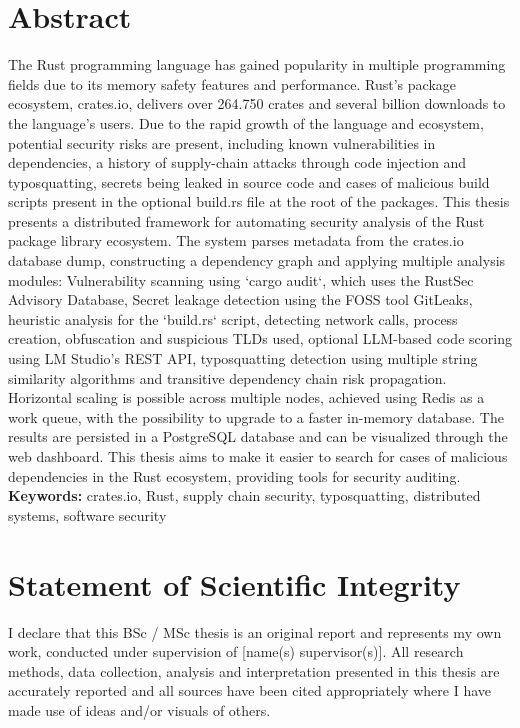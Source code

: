 \documentclass[12pt,a4paper]{book}
\theoremstyle{definition}
\theoremstyle{remark}
\begin{document}
\section*{Abstract} 
The Rust programming language has gained popularity in multiple programming fields due to its memory safety features and performance. Rust's package ecosystem, crates.io, delivers over 264.750 crates and several billion downloads to the language's users. Due to the rapid growth of the language and ecosystem, potential security risks are present, including known vulnerabilities in dependencies, a history of supply-chain attacks through code injection and typosquatting, secrets being leaked in source code and cases of malicious build scripts present in the optional build.rs file at the root of the packages. This thesis presents a distributed framework for automating security analysis of the Rust package library ecosystem. The system parses metadata from the crates.io database dump, constructing a dependency graph and applying multiple analysis modules: Vulnerability scanning using `cargo audit`, which uses the RustSec Advisory Database, Secret leakage detection using the FOSS tool GitLeaks, heuristic analysis for the `build.rs` script, detecting network calls, process creation, obfuscation and suspicious TLDs used, optional LLM-based code scoring using LM Studio's REST API, typosquatting detection using multiple string similarity algorithms and transitive dependency chain risk propagation. Horizontal scaling is possible across multiple nodes, achieved using Redis as a work queue, with the possibility to upgrade to a faster in-memory database. The results are persisted in a PostgreSQL database and can be visualized through the web dashboard. This thesis aims to make it easier to search for cases of malicious dependencies in the Rust ecosystem, providing tools for security auditing.
\newline
\textbf{Keywords:} crates.io, Rust, supply chain security, typosquatting, distributed systems, software security


\newpage

\section*{Statement of Scientific Integrity} 

I declare that this BSc / MSc thesis is an original report and represents my own work, conducted under supervision of [name(s) supervisor(s)]. All research methods, data collection, analysis and interpretation presented in this thesis are accurately reported and all sources have been cited appropriately where I have made use of ideas and/or visuals of others.
\end{document}
